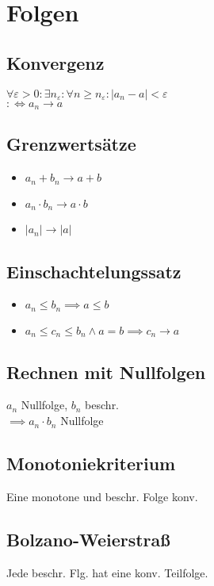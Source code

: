 \section*{Folgen}

\subsection*{Konvergenz}
$\forall \varepsilon>0: \exists n_\varepsilon: \forall n\ge n_\varepsilon: |a_n - a| < \varepsilon$ \\
$:\iff a_n \longrightarrow a$

\subsection*{Grenzwertsätze}
\begin{itemize}
	\item $a_n + b_n \longrightarrow a + b$
	\item $a_n \cdot b_n \longrightarrow a \cdot b$
	\item $|a_n| \longrightarrow |a|$
\end{itemize}

\subsection*{Einschachtelungssatz}
\begin{itemize}
	\item $a_n \le b_n \implies a \le b$
	\item $a_n \le c_n \le b_n \land a=b \implies c_n \to a$
\end{itemize}

\subsection*{Rechnen mit Nullfolgen}
$a_n$ Nullfolge, $b_n$ beschr. \\
$\implies a_n\cdot b_n$ Nullfolge

\subsection*{Monotoniekriterium}
Eine monotone und beschr. Folge konv.

\subsection*{Bolzano-Weierstraß}
Jede beschr. Flg. hat eine konv. Teilfolge.

